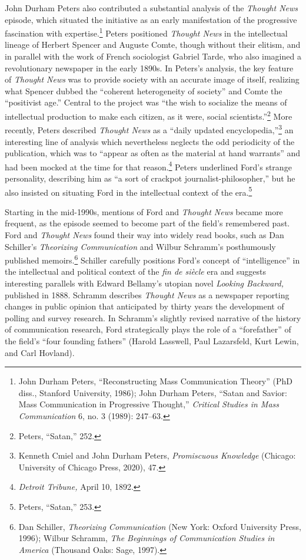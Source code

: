 \documentclass[openany,nobib]{tufte-book}
\begin{document}
John Durham Peters also contributed a substantial analysis of the
\emph{Thought News} episode, which situated the initiative as an early
manifestation of the progressive fascination with expertise.\footnote{John
  Durham Peters, ``Reconstructing Mass Communication Theory'' (PhD
  diss., Stanford University, 1986); John Durham Peters, ``Satan and
  Savior: Mass Communication in Progressive Thought,'' \emph{Critical
  Studies in Mass Communication} 6, no. 3 (1989): 247--63.} Peters
positioned \emph{Thought News} in the intellectual lineage of Herbert
Spencer and Auguste Comte, though without their elitism, and in parallel
with the work of French sociologist Gabriel Tarde, who also imagined a
revolutionary newspaper in the early 1890s. In Peters's analysis, the
key feature of \emph{Thought News} was to provide society with an
accurate image of itself, realizing what Spencer dubbed the ``coherent
heterogeneity of society'' and Comte the ``positivist age.'' Central to
the project was ``the wish to socialize the means of intellectual
production to make each citizen, as it were, social
scientists.''\footnote{Peters, ``Satan,'' 252.} More recently, Peters
described \emph{Thought News} as a ``daily updated
encyclopedia,''\footnote{Kenneth Cmiel and John Durham Peters,
  \emph{Promiscuous Knowledge} (Chicago: University of Chicago Press,
  2020), 47.} an interesting line of analysis which nevertheless
neglects the odd periodicity of the publication, which was to ``appear
as often as the material at hand warrants'' and had been mocked at the
time for that reason.\footnote{\emph{Detroit Tribune,} April 10, 1892.}
Peters underlined Ford's strange personality, describing him as ``a sort
of crackpot journalist-philosopher,'' but he also insisted on situating
Ford in the intellectual context of the era.\footnote{Peters, ``Satan,''
  253.}

Starting in the mid-1990s, mentions of Ford and \emph{Thought News}
became more frequent, as the episode seemed to become part of the
field's remembered past. Ford and \emph{Thought News} found their way
into widely read books, such as Dan Schiller's \emph{Theorizing
Communication} and Wilbur Schramm's posthumously published
memoirs.\footnote{Dan Schiller, \emph{Theorizing Communication} (New
  York: Oxford University Press, 1996); Wilbur Schramm, \emph{The
  Beginnings of Communication Studies in America} (Thousand Oaks: Sage,
  1997).} Schiller carefully positions Ford's concept of
``intelligence'' in the intellectual and political context of the
\emph{fin de siècle} era and suggests interesting parallels with Edward
Bellamy's utopian novel \emph{Looking Backward,} published in 1888.
Schramm describes \emph{Thought News} as a newspaper reporting changes
in public opinion that anticipated by thirty years the development of
polling and survey research. In Schramm's slightly revised narrative of
the history of communication research, Ford strategically plays the role
of a ``forefather'' of the field's ``four founding fathers'' (Harold
Lasswell, Paul Lazarsfeld, Kurt Lewin, and Carl Hovland).
\end{document}
